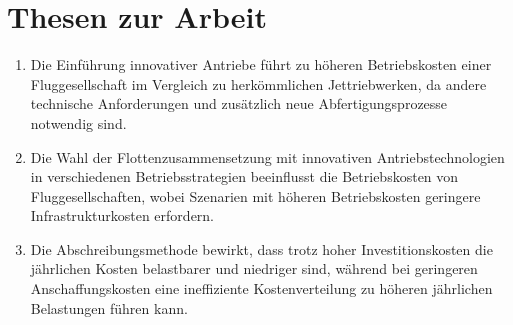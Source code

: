 \chapter*{Thesen zur Arbeit}
\label{ch:Thesen}
\thispagestyle{empty}

\begin{enumerate}
    \item Die Einführung innovativer Antriebe führt zu höheren Betriebskosten einer Fluggesellschaft im Vergleich zu herkömmlichen
    Jettriebwerken, da andere technische Anforderungen und zusätzlich neue Abfertigungsprozesse notwendig sind.
    \item Die Wahl der Flottenzusammensetzung mit innovativen Antriebstechnologien in verschiedenen 
    Betriebsstrategien beeinflusst die Betriebskosten von Fluggesellschaften, wobei Szenarien mit höheren 
    Betriebskosten geringere Infrastrukturkosten erfordern.
    \item Die Abschreibungsmethode bewirkt, dass trotz hoher Investitionskosten die jährlichen Kosten belastbarer 
    und niedriger sind, während bei geringeren Anschaffungskosten eine ineffiziente Kostenverteilung zu 
    höheren jährlichen Belastungen führen kann.
\end{enumerate}


